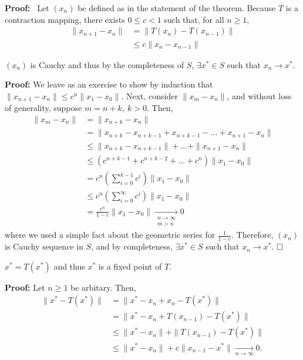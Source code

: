 \textbf{ Proof:}~ Let $(x_n)$ be defined as in the statement of the theorem. Because $T$ is a contraction mapping, there exists $0 \le c < 1$ such that, for all $n\geq 1$,
    \begin{align*}
        \| x_{n+1}-x_n \| &= \| T\left(x_n\right)-T\left(x_{n-1}\right) \|\\
        &\leq c \| x_n-x_{n-1}\|
    \end{align*}
    
\begin{claim} $(x_n)$ is Cauchy and thus by the completeness of $S$, $\exists x^\ast \in S$ such that $x_n \to x^\ast$.
\end{claim} 

\textbf{Proof:} We leave as an exercise to show by induction that $\| x_{n+1}-x_n \| \leq c ^n\| x_1-x_0 \|$. Next, consider $\| x_m-x_n \|$, and without loss of generality, suppose $m=n+k,\ k > 0$. Then,
    \begin{align*}
        \| x_m-x_n \| &= \| x_{n+k}-x_n \|\\
        &= \| x_{n+k}-x_{n+k-1}+x_{n+k-1}- \dots +x_{n+1}-x_n\|\\
        &\leq \| x_{n+k}-x_{n+k-1}\|+ \dots + \| x_{n+1}-x_n\|\\
        &\leq \left(c ^{n+k-1}+c ^{n+k-2}+ \dots + c ^n\right)\|x_1-x_0\|\\
        &= c ^n \left( \sum\limits_{i=0}^{k-1} c ^i \right) \|x_1-x_0\|\\
        &\leq c ^n \left( \sum\limits_{i=0}^\infty c ^i \right)\|x_1-x_0\|\\
        &= \frac{c ^n}{1-c}\|x_1-x_0\| \xrightarrow[\substack{n\to \infty \\ m >n}]{}0
    \end{align*}
where we used a simple fact about the geometric series for $\frac{1}{1-c}$. Therefore, $\left(x_n\right)$ is Cauchy sequence in $S$, and by completeness, $\exists x^\ast \in S$ such that $x_n \to x^\ast$. 
$\hfill \square$

\begin{claim} $x^\ast=T\left(x^\ast\right)$ and thus $x^\ast$ is a fixed point of $T$.
\end{claim} 

\textbf{Proof:} Let $n\ge 1$ be arbitary. Then,
    \begin{align*}
        \| x^\ast-T\left(x^\ast\right) \| &= \| x^\ast-x_n+x_n- T\left(x^\ast\right)\| \\
        &=\| x^\ast-x_n+T\left(x_{n-1}\right)- T\left(x^\ast\right)\| \\
        &\leq \| x^\ast-x_n\|+\|T\left(x_{n-1}\right)- T\left(x^\ast\right)\| \\
        &\leq \| x^\ast-x_n\|+c \|x_{n-1}-x^\ast\| \xrightarrow[n\to \infty]{}0.\ 
    \end{align*}
    
